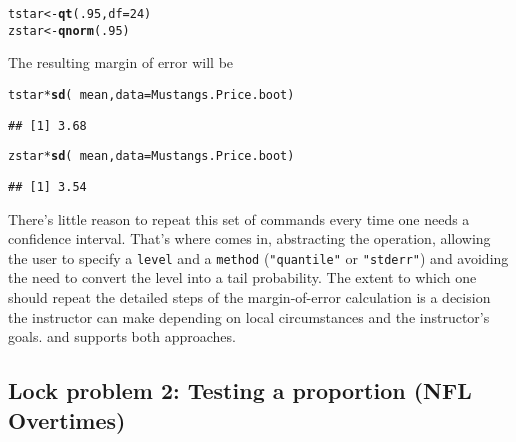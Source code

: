 \documentclass[11pt]{article}\usepackage[]{graphicx}\usepackage[]{color}
\makeatletter
\newcommand{\hlnum}[1]{\textcolor[rgb]{0.686,0.059,0.569}{#1}}%
\newcommand{\hlopt}[1]{\textcolor[rgb]{0,0,0}{#1}}%
\newcommand{\hlstd}[1]{\textcolor[rgb]{0.345,0.345,0.345}{#1}}%
\newcommand{\hlkwb}[1]{\textcolor[rgb]{0.69,0.353,0.396}{#1}}%
\newcommand{\hlkwc}[1]{\textcolor[rgb]{0.333,0.667,0.333}{#1}}%
\newcommand{\hlkwd}[1]{\textcolor[rgb]{0.737,0.353,0.396}{\textbf{#1}}}%
\newenvironment{kframe}{%
 \def\at@end@of@kframe{}%
 \ifinner\ifhmode%
  \def\at@end@of@kframe{\end{minipage}}%
  \begin{minipage}{\columnwidth}%
 \fi\fi%
 \def\FrameCommand##1{\hskip\@totalleftmargin \hskip-\fboxsep
 \colorbox{shadecolor}{##1}\hskip-\fboxsep
     \hskip-\linewidth \hskip-\@totalleftmargin \hskip\columnwidth}%
 \MakeFramed {\advance\hsize-\width
   \@totalleftmargin\z@ \linewidth\hsize
   \@setminipage}}%
 {\par\unskip\endMakeFramed%
 \at@end@of@kframe}
\newenvironment{knitrout}{}{} %
\makeatother
\begin{document}
\begin{itemize}
\begin{knitrout}
\color{fgcolor}\begin{kframe}
\begin{alltt}
\hlstd{tstar} \hlkwb{<-} \hlkwd{qt}\hlstd{(}\hlnum{.95}\hlstd{,} \hlkwc{df} \hlstd{=} \hlnum{24}\hlstd{)}
\hlstd{zstar} \hlkwb{<-} \hlkwd{qnorm}\hlstd{(}\hlnum{.95}\hlstd{)}
\end{alltt}
\end{kframe}
\end{knitrout}
The resulting
margin of error will be
\begin{knitrout}
\color{fgcolor}\begin{kframe}
\begin{alltt}
\hlstd{tstar} \hlopt{*} \hlkwd{sd}\hlstd{(}\hlopt{~} \hlstd{mean,} \hlkwc{data} \hlstd{= Mustangs.Price.boot)}
\end{alltt}
\begin{verbatim}
## [1] 3.68
\end{verbatim}
\begin{alltt}
\hlstd{zstar} \hlopt{*} \hlkwd{sd}\hlstd{(}\hlopt{~} \hlstd{mean,} \hlkwc{data} \hlstd{= Mustangs.Price.boot)}
\end{alltt}
\begin{verbatim}
## [1] 3.54
\end{verbatim}
\end{kframe}
\end{knitrout}

\end{itemize}

There's little reason to repeat this set of commands every time one needs a confidence interval.  That's where  comes in, abstracting the operation, allowing the user to specify a \texttt{level} and a \texttt{method} 
(\texttt{"quantile"} or \texttt{"stderr"}) and avoiding the need to convert the level into a tail probability.  The extent to which one should repeat the detailed steps of the margin-of-error calculation is a decision the instructor can make depending on local circumstances and the instructor's goals.  \R{} and  supports both approaches.



\subsection*{Lock problem 2: Testing a proportion (NFL Overtimes)}
\end{document}
